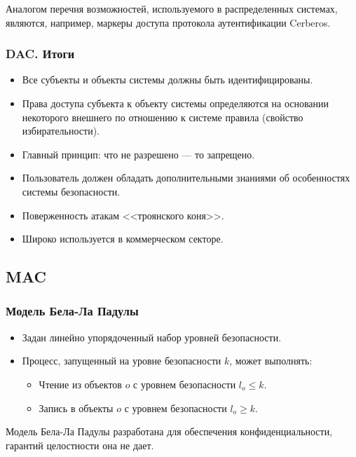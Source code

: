 Аналогом перечня возможностей, используемого в распределенных системах, являются, например, маркеры доступа протокола аутентификации Cerberos.


\begin{frame}
    \frametitle{DAC. Итоги}
    \begin{itemize}
        \item Все субъекты и объекты системы должны быть идентифицированы.
        \item Права доступа субъекта к объекту системы определяются на основании некоторого внешнего по отношению к системе правила (свойство избирательности).
        \item Главный принцип: что не разрешено --- то запрещено.
        \item Пользователь должен обладать дополнительными знаниями об особенностях системы безопасности.
        \item Поверженность атакам <<троянского коня>>.
        \item Широко используется в коммерческом секторе.
    \end{itemize}
\end{frame}


\subsection{MAC}

\begin{frame}
    \frametitle{Модель Бела-Ла Падулы}
    
    \begin{itemize}
        \item Задан линейно упорядоченный набор уровней безопасности.
        \item Процесс, запущенный на уровне безопасности $k$, может выполнять:
        \begin{itemize}
            \item Чтение из объектов $o$ с уровнем безопасности $l_o\leq k$.
            \item Запись в объекты $o$ с уровнем безопасности $l_o\geq k$.
        \end{itemize}
    \end{itemize}
    
    Модель Бела-Ла Падулы разработана для обеспечения \alert{конфиденциальности}, гарантий \alert{целостности} она не дает.
\end{frame}


